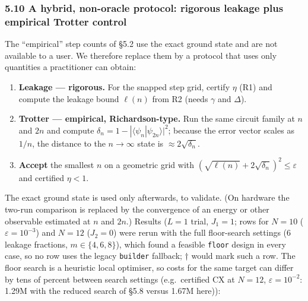 \documentclass[
]{article}
\providecommand{\tightlist}{%
  \setlength{\itemsep}{0pt}\setlength{\parskip}{0pt}}
\begin{document}
\hypertarget{a-hybrid-non-oracle-protocol-rigorous-leakage-plus-empirical-trotter-control}{%
\subsubsection{5.10 A hybrid, non-oracle protocol: rigorous leakage plus
empirical Trotter
control}\label{a-hybrid-non-oracle-protocol-rigorous-leakage-plus-empirical-trotter-control}}

The ``empirical'' step counts of §5.2 use the exact ground state and are
not available to a user. We therefore replace them by a protocol that
uses only quantities a practitioner can obtain:

\begin{enumerate}
\def\labelenumi{\arabic{enumi}.}
\tightlist
\item
  \textbf{Leakage --- rigorous.} For the snapped step grid, certify
  \(\eta\) (R1) and compute the leakage bound \(\ell(n)\) from R2 (needs
  \(\gamma\) and \(\Delta\)).
\item
  \textbf{Trotter --- empirical, Richardson-type.} Run the same circuit
  family at \(n\) and \(2n\) and compute
  \(\delta_n=1-|\langle\psi_n|\psi_{2n}\rangle|^2\); because the error
  vector scales as \(1/n\), the distance to the \(n\to\infty\) state is
  \(\approx2\sqrt{\delta_n}\).
\item
  \textbf{Accept} the smallest \(n\) on a geometric grid with
  \((\sqrt{\ell(n)}+2\sqrt{\delta_n})^2\le\varepsilon\) and certified
  \(\eta<1\).
\end{enumerate}

The exact ground state is used only afterwards, to validate. (On
hardware the two-run comparison is replaced by the convergence of an
energy or other observable estimated at \(n\) and \(2n\).) Results
(\(L=1\) trial, \(J_1=1\); rows for \(N=10\) (\(\varepsilon=10^{-3}\))
and \(N=12\) (\(J_2=0\)) were rerun with the full floor-search settings
(6 leakage fractions, \(m\in\{4,6,8\}\)), which found a feasible
\texttt{floor} design in every case, so no row uses the legacy
\texttt{builder} fallback; † would mark such a row. The floor search is
a heuristic local optimiser, so costs for the same target can differ by
tens of percent between search settings (e.g.~certified CX at \(N=12\),
\(\varepsilon=10^{-2}\): 1.29M with the reduced search of §5.8 versus
1.67M here)):
\end{document}
